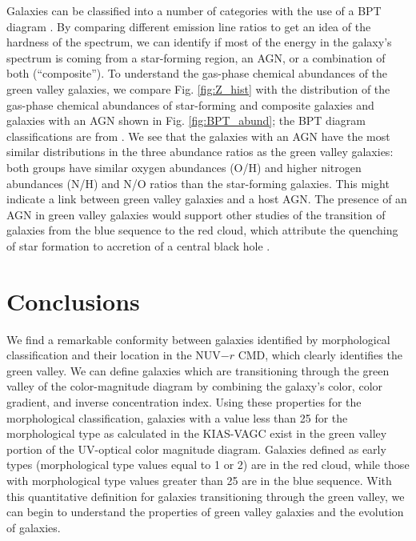 Galaxies can be classified into a number of categories with the use of a BPT 
diagram \citep{Baldwin81}.  By comparing different emission line ratios to get 
an idea of the hardness of the spectrum, we can identify if most of the energy 
in the galaxy's spectrum is coming from a star-forming region, an AGN, or a 
combination of both (``composite'').  To understand the gas-phase chemical 
abundances of the green valley galaxies, we compare Fig. \ref{fig:Z_hist} with 
the distribution of the gas-phase chemical abundances of star-forming and 
composite galaxies and galaxies with an AGN shown in Fig. \ref{fig:BPT_abund}; 
the BPT diagram classifications are from \cite{Brinchmann04}.  We see that the 
galaxies with an AGN have the most similar distributions in the three abundance 
ratios as the green valley galaxies: both groups have similar oxygen abundances 
(O/H) and higher nitrogen abundances (N/H) and N/O ratios than the star-forming 
galaxies.  This might indicate a link between green valley galaxies and a host 
AGN.  The presence of an AGN in green valley galaxies would support other 
studies of the transition of galaxies from the blue sequence to the red cloud, 
which attribute the quenching of star formation to accretion of a central black 
hole \citep[e.g.,][]{Croton06,Stasinska08}.





\section{Conclusions}

We find a remarkable conformity between galaxies identified by morphological 
classification and their location in the NUV$-r$ CMD, which clearly identifies 
the green valley.  We can define galaxies which are transitioning through the 
green valley of the color-magnitude diagram by combining the galaxy's color, 
color gradient, and inverse concentration index.  Using these properties for the 
morphological classification, galaxies with a value less than 25 for the 
morphological type as calculated in the KIAS-VAGC exist in the green valley 
portion of the UV-optical color magnitude diagram.  Galaxies defined as early 
types (morphological type values equal to 1 or 2) are in the red cloud, while 
those with morphological type values greater than 25 are in the blue sequence.  
With this quantitative definition for galaxies transitioning through the green 
valley, we can begin to understand the properties of green valley galaxies and 
the evolution of galaxies.

